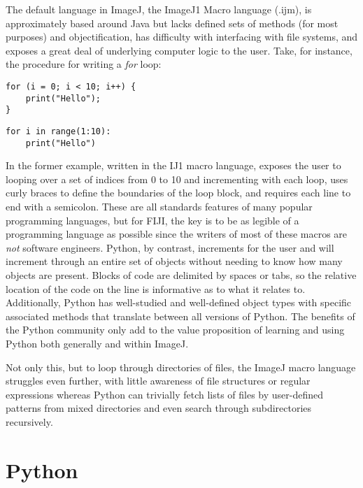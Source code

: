 The default language in ImageJ, the ImageJ1 Macro language (.ijm), is approximately based around Java but lacks defined sets of methods (for most purposes) and objectification, has difficulty with interfacing with file systems, and exposes a great deal of underlying computer logic to the user. Take, for instance, the procedure for writing a \textit{for} loop:

\begin{code}
\begin{verbatim}
for (i = 0; i < 10; i++) {
    print("Hello");
}
\end{verbatim}
\end{code}

\begin{code}
\begin{verbatim}
for i in range(1:10):
    print("Hello")
\end{verbatim}
\end{code}

In the former example, written in the IJ1 macro language, exposes the user to looping over a set of indices from 0 to 10 and incrementing with each loop, uses curly braces to define the boundaries of the loop block, and requires each line to end with a semicolon. These are all standards features of many popular programming languages, but for FIJI, the key is to be as legible of a programming language as possible since the writers of most of these macros are \textit{not} software engineers. Python, by contrast, increments for the user and will increment through an entire set of objects without needing to know how many objects are present. Blocks of code are delimited by spaces or tabs, so the relative location of the code on the line is informative as to what it relates to. Additionally, Python has well-studied and well-defined object types with specific associated methods that translate between all versions of Python. The benefits of the Python community only add to the value proposition of learning and using Python both generally and within ImageJ.

Not only this, but to loop through directories of files, the ImageJ macro language struggles even further, with little awareness of file structures or regular expressions whereas Python can trivially fetch lists of files by user-defined patterns from mixed directories and even search through subdirectories recursively.
 
\section{Python}\label{python}

